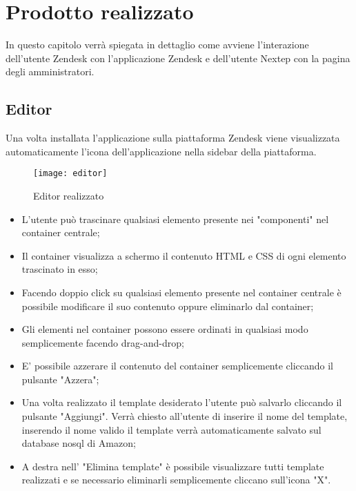 
\chapter{Prodotto realizzato}
\label{cap:progetto-terminato}
In questo capitolo verrà spiegata in dettaglio come avviene l’interazione dell'utente Zendesk con l'applicazione
Zendesk e dell'utente Nextep con la pagina degli amministratori.

\section{Editor}
Una volta installata l'applicazione sulla piattaforma Zendesk viene visualizzata automaticamente l'icona dell'applicazione nella sidebar della piattaforma. 
\begin{figure}[!h] 
	\centering 
	\texttt{[image: editor]} 
	\caption{Editor realizzato }
\end{figure}
\begin{itemize}
	\item L'utente può trascinare qualsiasi elemento presente nei "componenti" nel container centrale;
	\item Il container visualizza a schermo il contenuto  HTML e CSS di ogni elemento trascinato in esso;
	\item Facendo doppio click su qualsiasi elemento presente nel container centrale è possibile modificare il suo contenuto oppure eliminarlo dal container;
	\item Gli elementi nel container possono essere ordinati in qualsiasi modo semplicemente facendo drag-and-drop;
	\item E' possibile azzerare il contenuto del container semplicemente cliccando il pulsante "Azzera";
	\item Una volta realizzato il template desiderato l'utente può salvarlo cliccando il pulsante "Aggiungi". Verrà chiesto all'utente di inserire il nome del template, inserendo il nome valido il template verrà automaticamente salvato sul database nosql di Amazon;
	\item A destra nell' "Elimina template" è possibile visualizzare tutti template realizzati e se necessario eliminarli semplicemente cliccano sull'icona "X".  
\end{itemize}
